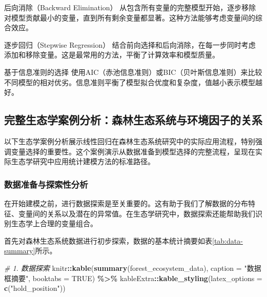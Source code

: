 \documentclass[
  twoside,12pt,fontset=none]{ctexbook}
\newenvironment{Shaded}{\begin{snugshade}}{\end{snugshade}}
\newcommand{\AttributeTok}[1]{\textcolor[rgb]{0.13,0.29,0.53}{#1}}
\newcommand{\CommentTok}[1]{\textcolor[rgb]{0.56,0.35,0.01}{\textit{#1}}}
\newcommand{\ConstantTok}[1]{\textcolor[rgb]{0.56,0.35,0.01}{#1}}
\newcommand{\FunctionTok}[1]{\textcolor[rgb]{0.13,0.29,0.53}{\textbf{#1}}}
\newcommand{\NormalTok}[1]{#1}
\newcommand{\SpecialCharTok}[1]{\textcolor[rgb]{0.81,0.36,0.00}{\textbf{#1}}}
\newcommand{\StringTok}[1]{\textcolor[rgb]{0.31,0.60,0.02}{#1}}
\begin{document}
后向消除（Backward Elimination）
从包含所有变量的完整模型开始，逐步移除对模型贡献最小的变量，直到所有剩余变量都显著。这种方法能够考虑变量间的综合效应。

逐步回归（Stepwise Regression）
结合前向选择和后向消除，在每一步同时考虑添加和移除变量。这是最常用的方法，平衡了计算效率和模型质量。

基于信息准则的选择
使用AIC（赤池信息准则）或BIC（贝叶斯信息准则）来比较不同模型的相对优劣。信息准则平衡了模型拟合优度和复杂度，值越小表示模型越好。

\hypertarget{ux5b8cux6574ux751fux6001ux5b66ux6848ux4f8bux5206ux6790ux68eeux6797ux751fux6001ux7cfbux7edfux4e0eux73afux5883ux56e0ux5b50ux7684ux5173ux7cfb}{%
\subsection{完整生态学案例分析：森林生态系统与环境因子的关系}\label{ux5b8cux6574ux751fux6001ux5b66ux6848ux4f8bux5206ux6790ux68eeux6797ux751fux6001ux7cfbux7edfux4e0eux73afux5883ux56e0ux5b50ux7684ux5173ux7cfb}}

以下生态学案例分析展示线性回归在森林生态系统研究中的实际应用流程，特别强调变量选择的重要性。这个案例演示从数据准备到模型选择的完整流程，呈现在实际生态学研究中应用统计建模方法的标准路径。

\hypertarget{ux6570ux636eux51c6ux5907ux4e0eux63a2ux7d22ux6027ux5206ux6790}{%
\subsubsection{数据准备与探索性分析}\label{ux6570ux636eux51c6ux5907ux4e0eux63a2ux7d22ux6027ux5206ux6790}}

在开始建模之前，进行数据探索是至关重要的。这有助于我们了解数据的分布特征、变量间的关系以及潜在的异常值。在生态学研究中，数据探索还能帮助我们识别生态学上合理的变量组合。

首先对森林生态系统数据进行初步探索，数据的基本统计摘要如表\ref{tab:data-summary}所示。

\begin{Shaded}
\begin{Highlighting}[]
\CommentTok{\# 1. 数据探索}
\NormalTok{knitr}\SpecialCharTok{::}\FunctionTok{kable}\NormalTok{(}\FunctionTok{summary}\NormalTok{(forest\_ecosystem\_data),}
             \AttributeTok{caption =} \StringTok{"数据框摘要"}\NormalTok{, }\AttributeTok{booktabs =} \ConstantTok{TRUE}\NormalTok{) }\SpecialCharTok{\%\textgreater{}\%}
\NormalTok{  kableExtra}\SpecialCharTok{::}\FunctionTok{kable\_styling}\NormalTok{(}\AttributeTok{latex\_options =} \FunctionTok{c}\NormalTok{(}\StringTok{"hold\_position"}\NormalTok{))}
\end{Highlighting}
\end{Shaded}
\end{document}
